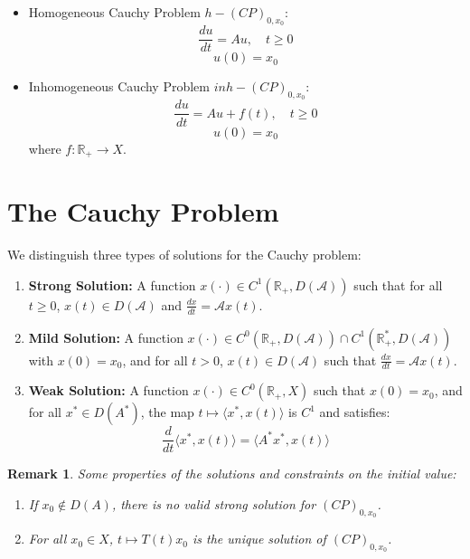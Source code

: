 \documentclass[12pt, oneside]{book}
\newtheorem{remark}{Remark}[section]
\newcommand{\A}{\mathscr{A}}
\begin{document}
\begin{itemize}
    \item Homogeneous Cauchy Problem $h-(CP)_{0, x_0}$: 
    $$ \frac{du}{dt} = Au, \quad t \ge 0 $$ 
    $$ u(0) = x_0 $$ 
    
    \item Inhomogeneous Cauchy Problem $inh-(CP)_{0,x_0}$: 
    $$ \frac{du}{dt} = Au + f(t), \quad t \ge 0 $$ 
    $$ u(0) = x_0 $$ 
    where $f: \mathbb{R}_+ \rightarrow X$. 
\end{itemize}

\section{The Cauchy Problem}

\begin{definition}
We distinguish three types of solutions for the Cauchy problem:
\begin{enumerate}
    \item \textbf{Strong Solution:} A function $x(\cdot) \in C^1(\mathbb{R}_+, D(\A))$ such that for all $t \ge 0$, $x(t) \in D(\A)$ and $\frac{dx}{dt} = \A x(t)$. 
    
    \item \textbf{Mild Solution:} A function $x(\cdot) \in C^0\left(\mathbb{R}_+, D(\A)\right) \cap C^1(\mathbb{R}_+^*, D(\A))$ with $x(0) = x_0$, and for all $t > 0$, $x(t) \in D(\A)$ such that $\frac{dx}{dt} = \A x(t)$. 
    
    \item \textbf{Weak Solution:} A function $x(\cdot) \in C^0(\mathbb{R}_+, X)$ such that $x(0) = x_0$, and for all $x^* \in D(A^*)$, the map $t \mapsto \langle x^*, x(t) \rangle$ is $C^1$ and satisfies:
    $$
    \frac{d}{dt} \langle x^*, x(t) \rangle = \langle A^* x^*, x(t) \rangle
    $$
\end{enumerate}
\end{definition}

\begin{remark} Some properties of the solutions and constraints on the initial value:
\begin{enumerate}
    \item If $x_0 \notin D(A)$, there is no valid strong solution for $(CP)_{0,x_0}$. 
    \item For all $x_0 \in X$, $t \mapsto T(t)x_0$ is the unique solution of $(CP)_{0,x_0}$. 
\end{enumerate}
\end{remark}
\end{document}
